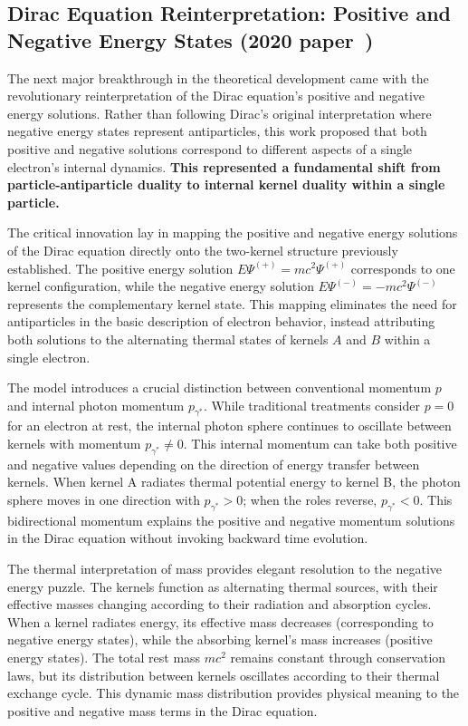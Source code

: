 \documentclass[%
 reprint,
 amsmath,amssymb,
 aps,
]{revtex4-1}
\numberwithin{equation}{section}%
\begin{document}
\subsection{Dirac Equation Reinterpretation: Positive and Negative Energy States (2020 paper~\cite{hanamura2006.0104})}

The next major breakthrough in the theoretical development came with the revolutionary reinterpretation of the Dirac equation's positive and negative energy solutions. Rather than following Dirac's original interpretation where negative energy states represent antiparticles, this work proposed that both positive and negative solutions correspond to different aspects of a single electron's internal dynamics. \textbf{This represented a fundamental shift from particle-antiparticle duality to internal kernel duality within a single particle.}

The critical innovation lay in mapping the positive and negative energy solutions of the Dirac equation directly onto the two-kernel structure previously established. The positive energy solution $E\Psi^{(+)} = mc^2\Psi^{(+)}$ corresponds to one kernel configuration, while the negative energy solution $E\Psi^{(-)} = -mc^2\Psi^{(-)}$ represents the complementary kernel state. This mapping eliminates the need for antiparticles in the basic description of electron behavior, instead attributing both solutions to the alternating thermal states of kernels $A$ and $B$ within a single electron.

The model introduces a crucial distinction between conventional momentum $p$ and internal photon momentum $p_{\gamma^*}$. While traditional treatments consider $p = 0$ for an electron at rest, the internal photon sphere continues to oscillate between kernels with momentum $p_{\gamma^*} \neq 0$. This internal momentum can take both positive and negative values depending on the direction of energy transfer between kernels. When kernel A radiates thermal potential energy to kernel B, the photon sphere moves in one direction with $p_{\gamma^*} > 0$; when the roles reverse, $p_{\gamma^*} < 0$. This bidirectional momentum explains the positive and negative momentum solutions in the Dirac equation without invoking backward time evolution.

The thermal interpretation of mass provides elegant resolution to the negative energy puzzle. The kernels function as alternating thermal sources, with their effective masses changing according to their radiation and absorption cycles. When a kernel radiates energy, its effective mass decreases (corresponding to negative energy states), while the absorbing kernel's mass increases (positive energy states). The total rest mass $mc^2$ remains constant through conservation laws, but its distribution between kernels oscillates according to their thermal exchange cycle. This dynamic mass distribution provides physical meaning to the positive and negative mass terms in the Dirac equation.
\end{document}
